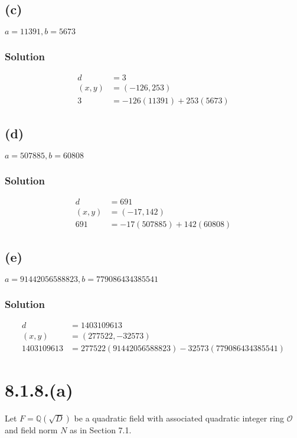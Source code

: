 \documentclass[fleqn]{article}
\begin{document}
        \subsection{(c)}
        $a = 11391, b = 5673$
            
            \subsubsection{Solution}
            \begin{align}
                d &= 3 \\
                (x, y) &= (-126, 253) \\
                3 &= -126(11391) + 253(5673)
            \end{align}
        
        \subsection{(d)}
        $a = 507885, b = 60808$
            
            \subsubsection{Solution}
            \begin{align}
                d &= 691 \\
                (x, y) &= (-17, 142) \\
                691 &= -17(507885) + 142(60808)
            \end{align}
        
        \subsection{(e)}
        $a = 91442056588823, b = 779086434385541$
            
            \subsubsection{Solution}
            \begin{align}
                d &= 1403109613 \\
                (x, y) &= (277522, -32573) \\
                1403109613 &= 277522(91442056588823) - 32573(779086434385541)
            \end{align}
    
    \section{8.1.8.(a)}
    Let $F = \mathbb{Q}\left(\sqrt{D}\right)$ be a quadratic field with associated quadratic integer ring $\mathcal{O}$ and field norm $N$ as in Section 7.1.
        
\end{document}
